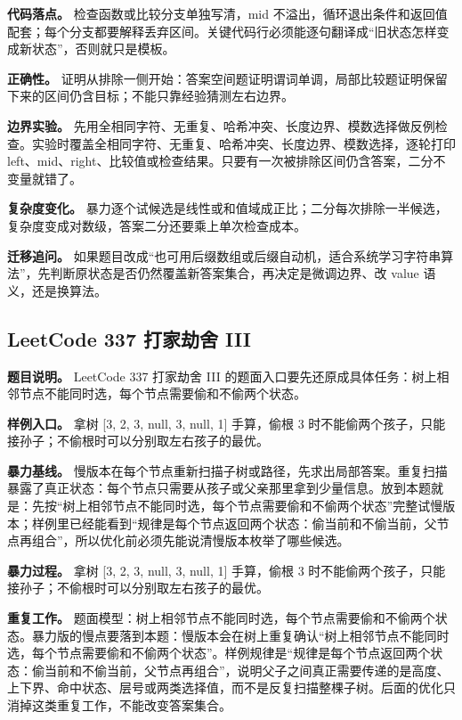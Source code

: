 \textbf{代码落点。} 检查函数或比较分支单独写清，mid 不溢出，循环退出条件和返回值配套；每个分支都要解释丢弃区间。关键代码行必须能逐句翻译成“旧状态怎样变成新状态”，否则就只是模板。

\textbf{正确性。} 证明从排除一侧开始：答案空间题证明谓词单调，局部比较题证明保留下来的区间仍含目标；不能只靠经验猜测左右边界。

\textbf{边界实验。} 先用全相同字符、无重复、哈希冲突、长度边界、模数选择做反例检查。实验时覆盖全相同字符、无重复、哈希冲突、长度边界、模数选择，逐轮打印 left、mid、right、比较值或检查结果。只要有一次被排除区间仍含答案，二分不变量就错了。

\textbf{复杂度变化。} 暴力逐个试候选是线性或和值域成正比；二分每次排除一半候选，复杂度变成对数级，答案二分还要乘上单次检查成本。

\textbf{迁移追问。} 如果题目改成“也可用后缀数组或后缀自动机，适合系统学习字符串算法”，先判断原状态是否仍然覆盖新答案集合，再决定是微调边界、改 value 语义，还是换算法。

\subsection{LeetCode 337 打家劫舍 III}

\textbf{题目说明。} LeetCode 337 打家劫舍 III 的题面入口要先还原成具体任务：树上相邻节点不能同时选，每个节点需要偷和不偷两个状态。

\textbf{样例入口。} 拿树 [3, 2, 3, null, 3, null, 1] 手算，偷根 3 时不能偷两个孩子，只能接孙子；不偷根时可以分别取左右孩子的最优。

\textbf{暴力基线。} 慢版本在每个节点重新扫描子树或路径，先求出局部答案。重复扫描暴露了真正状态：每个节点只需要从孩子或父亲那里拿到少量信息。放到本题就是：先按“树上相邻节点不能同时选，每个节点需要偷和不偷两个状态”完整试慢版本；样例里已经能看到“规律是每个节点返回两个状态：偷当前和不偷当前，父节点再组合”，所以优化前必须先能说清慢版本枚举了哪些候选。

\textbf{暴力过程。} 拿树 [3, 2, 3, null, 3, null, 1] 手算，偷根 3 时不能偷两个孩子，只能接孙子；不偷根时可以分别取左右孩子的最优。

\textbf{重复工作。} 题面模型：树上相邻节点不能同时选，每个节点需要偷和不偷两个状态。暴力版的慢点要落到本题：慢版本会在树上重复确认“树上相邻节点不能同时选，每个节点需要偷和不偷两个状态”。样例规律是“规律是每个节点返回两个状态：偷当前和不偷当前，父节点再组合”，说明父子之间真正需要传递的是高度、上下界、命中状态、层号或两类选择值，而不是反复扫描整棵子树。后面的优化只消掉这类重复工作，不能改变答案集合。

